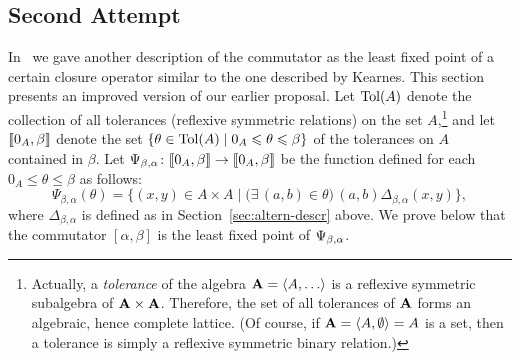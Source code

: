 \subsection{Second Attempt}
In~\cite{com-fix-poi} we gave another description of the commutator
as the least fixed point of a certain closure operator similar 
to the one described by Kearnes.
This section presents an improved version of our earlier proposal.
Let $\operatorname{Tol}(A)$ denote the collection of all tolerances (reflexive symmetric relations)
on the set $A$,\footnote{Actually, a
  \emph{tolerance} of the algebra $\bA = \<A, \dots\>$
  is a reflexive symmetric subalgebra of $\mathbf{A} \times \mathbf{A}$.
  Therefore, the set of all tolerances of $\mathbf{A}$ forms an
  algebraic, hence complete lattice.
  (Of course, if $\mathbf{A} = \langle A, \emptyset\rangle = A$ is a set, then a tolerance is
  simply a reflexive symmetric binary relation.) 
}
and let $\llbracket 0_A, \beta\rrbracket$ denote the set $\{\theta \in \operatorname{Tol}(A) \mid 0_A \leqslant \theta \leqslant \beta\}$ 
of the tolerances on $A$ contained in $\beta$.
Let $\Psi_{\beta, \alpha} \colon \llbracket 0_A, \beta\rrbracket\to \llbracket 0_A, \beta\rrbracket$ be the function defined
for each $0_A \leq \theta \leq \beta$ as
follows:
\begin{equation}
  \label{eq:7}
  \Psi_{\beta, \alpha}(\theta)
  = \{ (x,y) \in A\times A \mid
  \bigl(\exists\, (a,b) \in \theta\big)\,
 (a,b) \mathrel{\Delta_{\beta, \alpha}} (x,y)\},
\end{equation}
where $\Delta_{\beta, \alpha}$ is defined as 
in Section~\ref{sec:altern-descr} above.
We prove below that the commutator $[\alpha, \beta]$ is the least fixed
point of $\Psi_{\beta, \alpha}$.

\pagebreak


